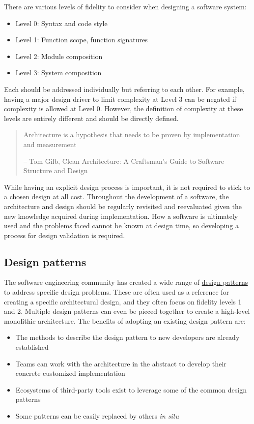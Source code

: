 \documentclass[]{nrel}
\begin{document}
There are various levels of fidelity to consider when designing a software system:
\begin{itemize}
\item Level 0: Syntax and code style
\item Level 1: Function scope, function signatures
\item Level 2: Module composition
\item Level 3: System composition
\end{itemize}

Each should be addressed individually but referring to each other. For example, having a major
design driver to limit complexity at Level 3 can be negated if complexity is allowed
at Level 0. However, the definition of complexity at these levels are entirely different and
should be directly defined.

\begin{quote}
    Architecture is a hypothesis that needs to be proven by implementation and measurement

    -- Tom Gilb, Clean Architecture: A Craftsman's Guide to Software Structure and Design
\end{quote}

While having an explicit design process is important, it is not required to stick to a chosen
design at all cost.
Throughout the development of a software, the architecture and design should be regularly
revisited and reevaluated given the new knowledge acquired during implementation.
How a software is ultimately used and the problems faced cannot be known at design time,
so developing a process for design validation is required.

\subsection{Design patterns}
The software engineering community has created a wide range of
\href{https://en.wikipedia.org/wiki/Software_design_pattern#Classification_and_list}{design patterns}
to address specific design problems.
These are often used as a reference for creating a specific architectural design,
and they often focus on fidelity levels 1 and 2.
Multiple design patterns can even be pieced together to create a high-level monolithic architecture.
The benefits of adopting an existing design pattern are:
\begin{itemize}
    
    \item The methods to describe the design pattern to new developers are already established
    \item Teams can work with the architecture in the abstract to develop their concrete customized
        implementation
    \item Ecosystems of third-party tools exist to leverage some of the common design patterns
    \item Some patterns can be easily replaced by others \textit{in situ}
\end{itemize}
\end{document}
